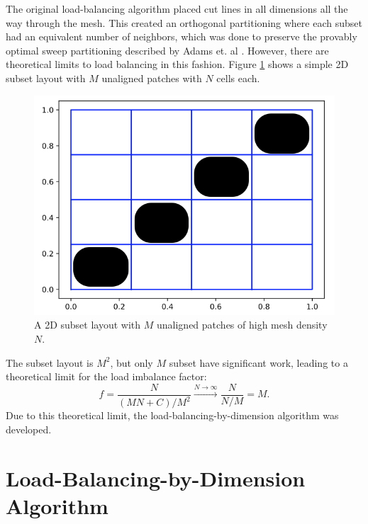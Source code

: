 The original load-balancing algorithm placed cut lines in all dimensions all the way through the mesh. 
This created an orthogonal partitioning where each subset had an equivalent number of neighbors, which was done to preserve the provably optimal sweep partitioning described by Adams et. al \cite{mpadams2013,mpadams2015}. 
However, there are theoretical limits to load balancing in this fashion. Figure \ref{2dgeneral} shows a simple 2D subset layout with $M$ unaligned patches with $N$ cells each.

\begin{figure}[H]
\centering
\includegraphics[scale=0.4]{../figures/theoretical_plot.png}
 \caption{A 2D subset layout with $M$ unaligned patches of high mesh density $N$.}
\label{2dgeneral}
\end{figure}
The subset layout is $M^2$, but only $M$ subset have significant work, leading to a theoretical limit for the load imbalance factor:
\begin{equation}
f= \frac{N}{(MN+C)/M^2} \xrightarrow{N\to \infty} \frac{N}{N/M} = M.
\end{equation}
Due to this theoretical limit, the load-balancing-by-dimension algorithm was developed.

\section{Load-Balancing-by-Dimension Algorithm}
\label{sec:lbd}

